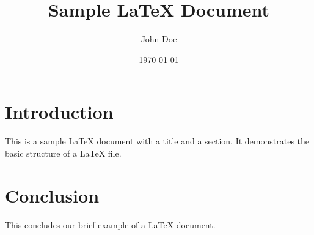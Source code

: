 \documentclass{article}
\title{Sample LaTeX Document}
\author{John Doe}
\date{\today}
\begin{document}
\maketitle

\section{Introduction}
This is a sample LaTeX document with a title and a section. It demonstrates the basic structure of a LaTeX file.

\section{Conclusion}
This concludes our brief example of a LaTeX document.
\end{document}
